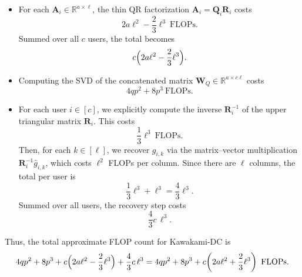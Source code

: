 \documentclass[final,3p,times]{elsarticle}
\theoremstyle{plain}
\newcommand{\matr}[1]{\bm{#1}}        %
\begin{document}
\begin{itemize}
    \item For each $\matr{A}_{i}\in\mathbb{R}^{a\times \ell}$, the thin QR
        factorization $\matr{A}_{i}=\matr{Q}_{i}\matr{R}_{i}$ costs
        \begin{equation}
            2 a\ell^{2} - \frac{2}{3}\ell^{3}\ \text{FLOPs}.
        \end{equation}
        Summed over all $c$ users, the total becomes
        \begin{equation}
            c\Bigl(2 a\ell^{2} - \frac{2}{3}\ell^{3}\Bigr).
        \end{equation}

    \item Computing the SVD of the concatenated matrix
        $\matr{W}_{Q}\in\mathbb{R}^{a\times c\ell}$ costs
        \begin{equation}
            4 q p^{2} + 8 p^{3}\ \text{FLOPs}.
        \end{equation}

    \item For each user $i\in[c]$, we explicitly compute the inverse
        $\matr{R}_{i}^{-1}$ of the upper triangular matrix $\matr{R}_{i}$. This costs
        \begin{equation}
            \frac{1}{3}\ell^{3}\ \text{FLOPs}.
        \end{equation}
        Then, for each $k\in[\ell]$, we recover $g_{i,k}$ via the matrix--vector multiplication $\matr{R}_{i}^{-1}\hat g_{i,k}$, which costs $\ell^{2}$ FLOPs per column. Since there are $\ell$ columns, the total per user is
        \begin{equation}
            \frac{1}{3}\ell^{3} + \ell^{3}
            = \frac{4}{3}\ell^{3}.
        \end{equation}
        Summed over all users, the recovery step costs
        \begin{equation}
            \frac{4}{3} c\,\ell^{3}.
        \end{equation}
\end{itemize}

Thus, the total approximate FLOP count for Kawakami-DC is
\begin{equation}
    \label{eq:kawakami-flops-inverse}
    4 q p^{2} + 8 p^{3}
    + c\Bigl(2 a\ell^{2} - \frac{2}{3}\ell^{3}\Bigr)
    + \frac{4}{3}c\,\ell^{3}
    =
    4 q p^{2} + 8 p^{3}
    + c\!\left(2 a\ell^{2}
        + \frac{2}{3}\ell^{3}
      \right)
    \ \text{FLOPs}.
\end{equation}
\end{document}
